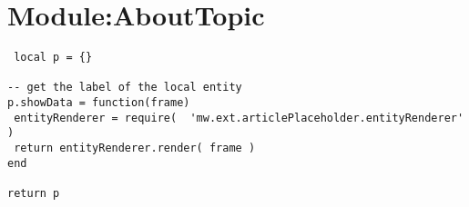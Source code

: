 \section{Module:AboutTopic}
\begin{lstlisting}
 local p = {}

-- get the label of the local entity
p.showData = function(frame)
 entityRenderer = require(  'mw.ext.articlePlaceholder.entityRenderer'  )
 return entityRenderer.render( frame )
end

return p
\end{lstlisting}

